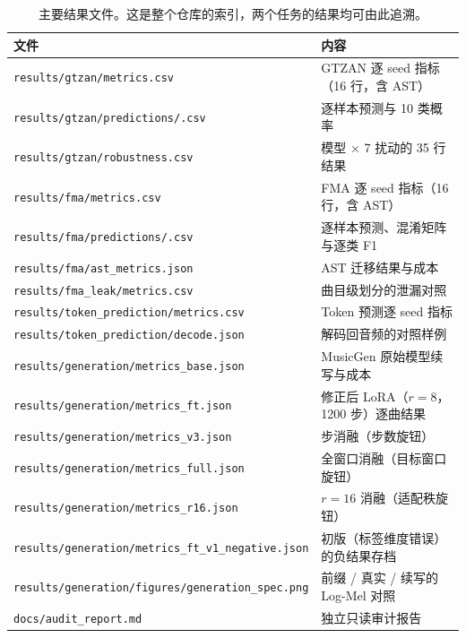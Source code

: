 \documentclass[UTF8,10pt,a4paper]{ctexart}
\begin{document}
\begin{table}[H]
\centering\small
\caption{主要结果文件。这是整个仓库的索引，两个任务的结果均可由此追溯。}
\label{tab:files}
\begin{tabular}{@{}>{\raggedright\arraybackslash}p{6.4cm}>{\raggedright\arraybackslash}p{8.3cm}@{}}
\toprule
文件 & 内容\\
\midrule
\texttt{results/\allowbreak gtzan/\allowbreak metrics.csv} & GTZAN 逐 seed 指标（16 行，含 AST）\\
\texttt{results/\allowbreak gtzan/\allowbreak predictions/\allowbreak *.csv} & 逐样本预测与 10 类概率\\
\texttt{results/\allowbreak gtzan/\allowbreak robustness.csv} & 5 模型 × 7 扰动的 35 行结果\\
\texttt{results/\allowbreak fma/\allowbreak metrics.csv} & FMA 逐 seed 指标（16 行，含 AST）\\
\texttt{results/\allowbreak fma/\allowbreak predictions/\allowbreak *.csv} & 逐样本预测、混淆矩阵与逐类 F1\\
\texttt{results/\allowbreak fma/\allowbreak ast\_\allowbreak metrics.json} & AST 迁移结果与成本\\
\texttt{results/\allowbreak fma\_\allowbreak leak/\allowbreak metrics.csv} & 曲目级划分的泄漏对照\\
\texttt{results/\allowbreak token\_\allowbreak prediction/\allowbreak metrics.csv} & Token 预测逐 seed 指标\\
\texttt{results/\allowbreak token\_\allowbreak prediction/\allowbreak decode.json} & 解码回音频的对照样例\\
\texttt{results/\allowbreak generation/\allowbreak metrics\_\allowbreak base.json} & MusicGen 原始模型续写与成本\\
\texttt{results/\allowbreak generation/\allowbreak metrics\_\allowbreak ft.json} & 修正后 LoRA（$r{=}8$，1200 步）逐曲结果\\
\texttt{results/\allowbreak generation/\allowbreak metrics\_\allowbreak v3.json} & 3600 步消融（步数旋钮）\\
\texttt{results/\allowbreak generation/\allowbreak metrics\_\allowbreak full.json} & 全窗口消融（目标窗口旋钮）\\
\texttt{results/\allowbreak generation/\allowbreak metrics\_\allowbreak r16.json} & $r{=}16$ 消融（适配秩旋钮）\\
\texttt{results/\allowbreak generation/\allowbreak metrics\_\allowbreak ft\_\allowbreak v1\_\allowbreak negative.json} & 初版（标签维度错误）的负结果存档\\
\texttt{results/\allowbreak generation/\allowbreak figures/\allowbreak generation\_\allowbreak spec.png} & 前缀 / 真实 / 续写的 Log-Mel 对照\\
\texttt{docs/\allowbreak audit\_\allowbreak report.md} & 独立只读审计报告\\
\bottomrule
\end{tabular}
\end{table}
\end{document}
